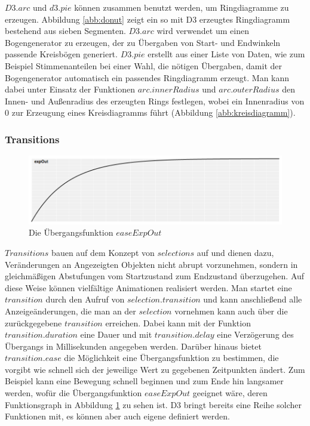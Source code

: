 $D3.arc$ und $d3.pie$ können zusammen benutzt werden, um Ringdiagramme zu erzeugen. Abbildung \ref{abb:donut} zeigt ein so mit D3 erzeugtes Ringdiagramm  bestehend aus sieben Segmenten. $D3.arc$ wird verwendet um einen Bogengenerator zu erzeugen, der zu Übergaben von Start- und Endwinkeln passende Kreisbögen generiert. $D3.pie$ erstellt aus einer Liste von Daten, wie zum Beispiel Stimmenanteilen bei einer Wahl, die nötigen Übergaben, damit der Bogengenerator automatisch ein passendes Ringdiagramm erzeugt. Man kann dabei unter Einsatz der Funktionen $arc.innerRadius$ und $arc.outerRadius$ den Innen- und Außenradius des erzeugten Rings festlegen, wobei ein Innenradius von 0 zur Erzeugung eines Kreisdiagramms führt (Abbildung \ref{abb:kreisdiagramm}).

\subsubsection*{Transitions}
\begin{figure}
	\centering
	\includegraphics[width=\linewidth]{../screenshots/expOut.png}
	\caption{Die Übergangsfunktion $easeExpOut$}
	\label{abb:easing}
\end{figure}
$Transitions$ bauen auf dem Konzept von $selections$ auf und dienen dazu, Veränderungen an Angezeigten Objekten nicht abrupt vorzunehmen, sondern in gleichmäßigen Abstufungen vom Startzustand zum Endzustand überzugehen. Auf diese Weise können vielfältige Animationen realisiert werden. Man startet eine $transition$ durch den Aufruf von $selection.transition$ und kann anschließend alle Anzeigeänderungen, die man an der $selection$ vornehmen kann auch über die zurückgegebene $transition$ erreichen. Dabei kann mit der Funktion $transition.duration$ eine Dauer und mit $transition.delay$ eine Verzögerung des Übergangs in Millisekunden angegeben werden. Darüber hinaus bietet $transition.ease$ die Möglichkeit eine Übergangsfunktion zu bestimmen, die vorgibt wie schnell sich der jeweilige Wert zu gegebenen Zeitpunkten ändert. Zum Beispiel kann eine Bewegung schnell beginnen und zum Ende hin langsamer werden, wofür die Übergangsfunktion $easeExpOut$ geeignet wäre, deren Funktionsgraph in Abbildung \ref{abb:easing}  zu sehen ist. D3 bringt bereits eine Reihe solcher Funktionen mit, es können aber auch eigene definiert werden.

